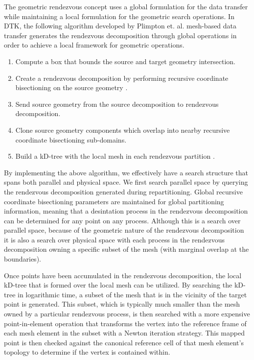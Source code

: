 \documentclass{mc2013}
\begin{document}
\label{subsec:rendezvous_algorithm}

The geometric rendezvous concept uses a global formulation for the
data transfer while maintaining a local formulation for the geometric
search operations. In DTK, the following algorithm developed by
Plimpton et. al. \cite{Plimpton_2004} mesh-based data transfer
generates the rendezvous decomposition through global operations in
order to achieve a local framework for geometric operations.
\begin{enumerate}
\item Compute a box that bounds the source and target geometry
  intersection.
\item Create a rendezvous decomposition by performing recursive
  coordinate bisectioning on the source geometry \cite{Berger_1987}.
\item Send source geometry from the source decomposition to rendezvous
  decomposition.
\item Clone source geometry components which overlap into nearby
  recursive coordinate bisectioning sub-domains.
\item Build a kD-tree with the local mesh in each rendezvous
  partition \cite{Bentley_1975}.
\end{enumerate}
By implementing the above algorithm, we effectively have a search
structure that spans both parallel and physical space. We first search
parallel space by querying the rendezvous decomposition generated
during repartitioning. Global recursive coordinate bisectioning
parameters are maintained for global partitioning information, meaning
that a desintation process in the rendezvous decomposition can be
determined for any point on any process. Although this is a search
over parallel space, because of the geometric nature of the rendezvous
decomposition it is also a search over physical space with each
process in the rendezvous decomposition owning a specific subset of
the mesh (with marginal overlap at the boundaries).
 
Once points have been accumulated in the rendezvous decomposition, the
local kD-tree that is formed over the local mesh can be utilized. By
searching the kD-tree in logarithmic time, a subset of the mesh that
is in the vicinity of the target point is generated. This subset,
which is typically much smaller than the mesh owned by a particular
rendezvous process, is then searched with a more expensive
point-in-element operation that transforms the vertex into the
reference frame of each mesh element in the subset with a Newton
iteration strategy. This mapped point is then checked against the
canonical reference cell of that mesh element's topology to determine
if the vertex is contained within.
\end{document}
